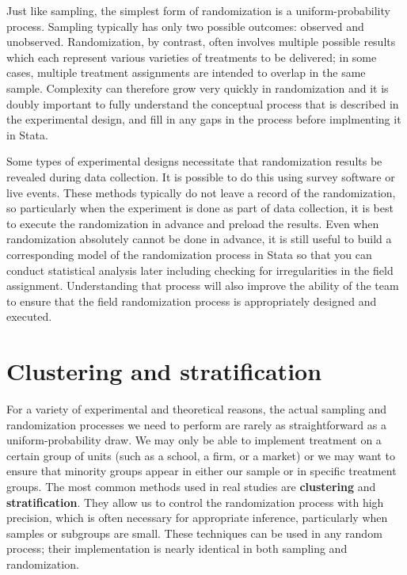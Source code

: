 Just like sampling, the simplest form of randomization is a uniform-probability process.
Sampling typically has only two possible outcomes: observed and unobserved.
Randomization, by contrast, often involves multiple possible results
which each represent various varieties of treatments to be delivered;
in some cases, multiple treatment assignments are intended to overlap in the same sample.
Complexity can therefore grow very quickly in randomization
and it is doubly important to fully understand the conceptual process
that is described in the experimental design,
and fill in any gaps in the process before implmenting it in Stata.

Some types of experimental designs necessitate that randomization results be revealed during data collection.
It is possible to do this using survey software or live events.
These methods typically do not leave a record of the randomization,
so particularly when the experiment is done as part of data collection,
it is best to execute the randomization in advance and preload the results.
Even when randomization absolutely cannot be done in advance, it is still useful
to build a corresponding model of the randomization process in Stata
so that you can conduct statistical analysis later
including checking for irregularities in the field assignment.
Understanding that process will also improve the ability of the team
to ensure that the field randomization process is appropriately designed and executed.


\section{Clustering and stratification}

For a variety of experimental and theoretical reasons,
the actual sampling and randomization processes we need to perform
are rarely as straightforward as a uniform-probability draw.
We may only be able to implement treatment on a certain group of units
(such as a school, a firm, or a market)
or we may want to ensure that minority groups appear
in either our sample or in specific treatment groups.
The most common methods used in real studies are \textbf{clustering} and \textbf{stratification}.
They allow us to control the randomization process with high precision,
which is often necessary for appropriate inference,
particularly when samples or subgroups are small.\cite{athey2017econometrics}
These techniques can be used in any random process;
their implementation is nearly identical in both sampling and randomization.

